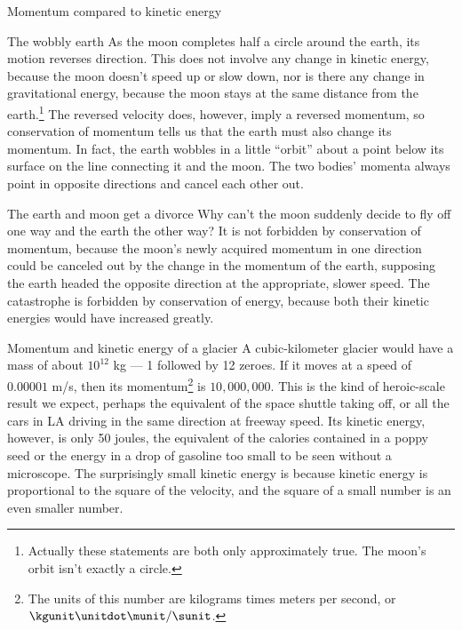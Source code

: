 \begin{envsubsection}{Momentum compared to kinetic energy}
\begin{eg}{The wobbly earth}
As the moon completes half a circle around the earth, its
motion reverses direction. This does not involve any change
in kinetic energy, because the moon doesn't speed up or slow
down, nor is there any change in gravitational energy, because
the moon stays at the same distance from the earth.\footnote{Actually these
statements are both only approximately true. The moon's orbit isn't exactly a circle.}
 The reversed velocity 
does, however, imply a reversed momentum, so
conservation of momentum 
tells us that the earth must also change its momentum. In
fact, the earth wobbles in a little ``orbit'' about a point
below its surface on the line connecting it and the moon.
The two bodies' momenta always point in opposite
directions and cancel each other out.
\end{eg}

\begin{eg}{The earth and moon get a divorce}\label{eg:earthmoondivorce}
Why can't the moon suddenly decide to fly off one way and
the earth the other way? It is not forbidden by conservation
of momentum, because the moon's newly acquired momentum in
one direction could be canceled out by the change in the
momentum of the earth, supposing the earth headed the
opposite direction at the appropriate, slower speed. The
catastrophe is forbidden by conservation of energy, because
both their kinetic energies would have increased greatly.
\end{eg}

\begin{eg}{Momentum and kinetic energy of a glacier}
A cubic-kilometer glacier would have a mass of about
$10^{12}$  kg --- 1 followed by 12 zeroes. If it moves at a speed of $0.00001$  m/s,
then its momentum\footnote{The units of this number are
kilograms times meters per second, or $\kgunit\unitdot\munit/\sunit$.} is $10,000,000$. 
This is the kind of
heroic-scale result we expect, perhaps the equivalent of the
space shuttle taking off, or all the cars in LA driving in
the same direction at freeway speed. Its kinetic energy,
however, is only 50 joules, the equivalent of the calories
contained in a poppy seed or the energy in a drop of
gasoline too small to be seen without a microscope. The
surprisingly small kinetic energy is because kinetic energy
is proportional to the square of the velocity, and the
square of a small number is an even smaller number.
\end{eg}
\end{envsubsection}
